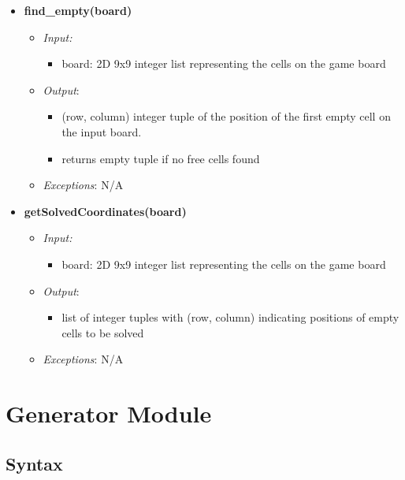 \documentclass[11pt]{article}
\begin{document}
\begin{itemize}
	    \item \textbf{find\_empty(board)}
		\begin{itemize}
		    \item[] \textit{Input: } 
		    \begin{itemize}
		        \item board: 2D 9x9 integer list representing the cells on the game board
		    \end{itemize}	  
		    \item[] \textit{Output}: 
		    \begin{itemize}
		        \item (row, column) integer tuple of the position of the first empty cell on the input board.
		        \item returns empty tuple if no free cells found
		    \end{itemize}
		    \item[] \textit{Exceptions}:
		    N/A
		\end{itemize}
		
		\item \textbf{getSolvedCoordinates(board)}
		\begin{itemize}
		    \item[] \textit{Input: } 
		    \begin{itemize}
		        \item board: 2D 9x9 integer list representing the cells on the game board
		    \end{itemize}	  
		    \item[] \textit{Output}: 
		    \begin{itemize}
		        \item list of integer tuples with (row, column) indicating positions of empty cells to be solved
		    \end{itemize}
		    \item[] \textit{Exceptions}:
		    N/A
		\end{itemize}
		
    \end{itemize}
    

\section{Generator Module}
		\subsection{Syntax}
\end{document}
